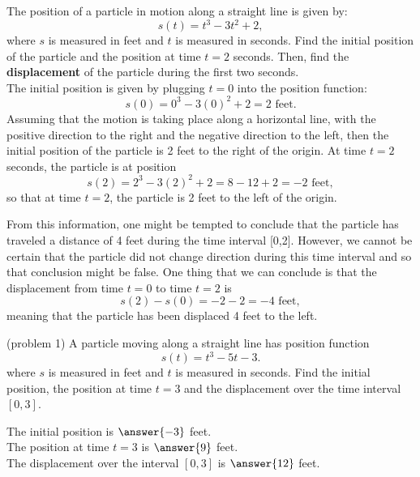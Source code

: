 \documentclass[handout]{ximera}
\begin{document}
\begin{example}[example 1]
The position  of a particle in motion along a straight line is given by:
\[s(t) = t^3 - 3t^2 + 2,\]
where $s$ is measured in feet and $t$ is measured in seconds.
Find the initial position of the particle and the position at time $t = 2$ seconds.
Then, find the \textbf{displacement} of the particle during the first two seconds.\\

The initial position is given by plugging $t=0$ into the position function: 
\[s(0) = 0^3 -3(0)^2 + 2 = 2 \text{ feet}.\]
Assuming that the motion is taking place along a horizontal line,
with the positive direction to the right and the negative direction to the left, then the initial position 
of the particle is 2 feet to the right of the origin.
At time $t=2$ seconds, the particle is at position
\[s(2) = 2^3 -3(2)^2 + 2 = 8 - 12 + 2 = -2 \text{ feet},\]
so that at time $t = 2$, the particle is 2 feet to the left of the origin.
\begin{center}
\end{center}

From this information, one might be tempted to conclude that the particle has traveled a distance  of 4 feet
during the time interval [0,2].  However, we cannot be certain that the particle did not change direction 
during this time interval and so that conclusion might be false. 
One thing that we can conclude is that the displacement from 
time $t = 0$ to time $t = 2$ is
\[s(2) - s(0) = -2 - 2 = -4 \text{ feet},\]
meaning that the particle has been displaced 4 feet to the left. 
 




\end{example}



\begin{problem}(problem 1)
A particle moving along a straight line has position function
\[s(t) = t^3 - 5t -3.\]
where $s$ is measured in feet and $t$ is measured in seconds.
Find the initial position, the position at time $t = 3$ 
and the displacement over the time interval $[0,3]$.

The initial position is $\answer{-3}$ feet.\\
The position at time $t=3$ is $\answer{9}$ feet.\\
The displacement over the interval $[0,3]$ is $\answer{12}$ feet.\\

\end{problem}
\end{document}

